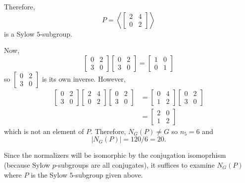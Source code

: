 \documentclass[12pt]{AlgebraQual}
\begin{document}
\begin{solution}
\begin{enumerate}[label=(\alph*)]
    Therefore, $$P=\left\langle\begin{bmatrix}
    2 & 4\\
    0 & 2
    \end{bmatrix}\right\rangle$$ is a Sylow $5$-subgroup.

    Now, $$\begin{bmatrix}
    0 & 2\\
    3 & 0
    \end{bmatrix}\begin{bmatrix}
    0 & 2\\
    3 & 0
    \end{bmatrix}=\begin{bmatrix}
    1 & 0\\
    0 & 1
    \end{bmatrix}$$ so $\begin{bmatrix}
    0 & 2\\
    3 & 0
    \end{bmatrix}$ is its own inverse. However, \begin{align*}
        \begin{bmatrix}
    0 & 2\\
    3 & 0
    \end{bmatrix}\begin{bmatrix}
    2 & 4\\
    0 & 2
    \end{bmatrix}\begin{bmatrix}
    0 & 2\\
    3 & 0
    \end{bmatrix}&=\begin{bmatrix}
    0 & 4\\
    1 & 2
    \end{bmatrix}\begin{bmatrix}
    0 & 2\\
    3 & 0
    \end{bmatrix}\\
    &=\begin{bmatrix}
    2 & 0\\
    1 & 2
    \end{bmatrix}
    \end{align*} which is not an element of $P$. Therefore, $N_G(P)\not=G$ so $n_5=6$ and $$|N_G(P)|=120/6=20.$$

    Since the normalizers will be isomorphic by the conjugation isomoprhism (because Sylow $p$-subgroups are all conjugates), it suffices to examine $N_G(P)$ where $P$ is the Sylow $5$-subgroup given above.


\end{enumerate}
\end{solution}
\end{document}
